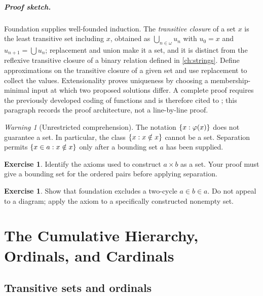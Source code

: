 \documentclass[11pt,oneside,openany]{book}
\theoremstyle{definition}
\newtheorem{exercise}[definition]{Exercise}
\theoremstyle{plain}
\theoremstyle{remark}
\newtheorem{warning}[definition]{Warning}
\DeclarePairedDelimiter{\set}{\lbrace}{\rbrace}
\begin{document}
\paragraph{Proof sketch.}
Foundation supplies well-founded induction.  The \emph{transitive closure}
of a set \(x\) is the least transitive set including \(x\), obtained as
\(\bigcup_{n\in\omega}u_n\) with \(u_0=x\) and
\(u_{n+1}=\bigcup u_n\); replacement and union make it a set, and it is
distinct from the reflexive transitive closure of a binary relation defined
in \cref{ch:strings}.  Define approximations on the
transitive closure of a given set and use replacement to collect the values.
Extensionality proves uniqueness by choosing a membership-minimal input at
which two proposed solutions differ.  A complete proof requires the previously
developed coding of functions and is therefore cited to \cite{Jech2003}; this
paragraph records the proof architecture, not a line-by-line proof.

\begin{warning}[Unrestricted comprehension]
The notation \(\set{x:\varphi(x)}\) does not guarantee a set.  In particular,
the class \(\set{x:x\notin x}\) cannot be a set.  Separation permits
\(\set{x\in a:x\notin x}\) only after a bounding set \(a\) has been supplied.
\end{warning}

\begin{exercise}
\label{ex:zf-zfc-01}
Identify the axioms used to construct \(a\times b\) as a set.  Your proof must
give a bounding set for the ordered pairs before applying separation.
\end{exercise}

\begin{exercise}
\label{ex:zf-zfc-02}
Show that foundation excludes a two-cycle \(a\in b\in a\).  Do not appeal to a
diagram; apply the axiom to a specifically constructed nonempty set.
\end{exercise}

\chapter[Hierarchy, Ordinals, and Cardinals]{The Cumulative Hierarchy, Ordinals, and Cardinals}
\label{ch:cumulative-hierarchy}

\section{Transitive sets and ordinals}
\label{sec:cumulative-hierarchy-01}
\end{document}
